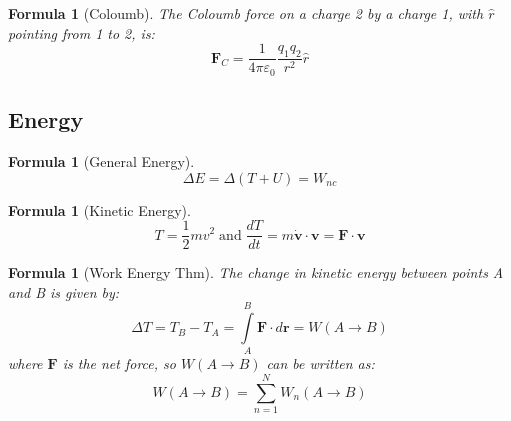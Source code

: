\documentclass[12pt]{article}
\newtheorem{for}[thm]{Formula}
\theoremstyle{definition}
\theoremstyle{remark}
\numberwithin{equation}{section}
\newcommand\B[1]{\textbf{#1}}
\begin{document}
\vspace{15pt}


\begin{for}[Coloumb]
        The Coloumb force on a charge 2 by a charge 1, with $\hat{r}$ pointing from 1 to 2, is:
        \begin{equation}
                \B{F}_C = \frac{1}{4\pi \varepsilon_0}\frac{q_1q_2}{r^2}\hat{r}
        \end{equation}
\end{for}


\vspace{15pt}


\subsection{Energy}


\begin{for}[General Energy]
        \begin{equation}
                \Delta E = \Delta(T + U) = W_{nc}
        \end{equation}
\end{for}

\vspace{15pt}

\begin{for}[Kinetic Energy]
        \begin{equation}
                T = \frac{1}{2}mv^2\;\text{and}\;\frac{dT}{dt} = m\dot{\B{v}}\cdot\B{v} = \B{F} \cdot\B{v}
        \end{equation}
\end{for}


\vspace{15pt}

\begin{for}[Work Energy Thm]
        The change in kinetic energy between points A and B is given by:
        \begin{equation}
                \Delta T = T_B - T_A = \int\limits_{A}^B\B{F}\cdot d\B{r} = W(A\rightarrow B)
        \end{equation}
        where $\B{F}$ is the net force, so $W(A\rightarrow B)$ can be written as:
        \begin{equation}
                W(A\rightarrow B) = \sum\limits_{n=1}^NW_n(A\rightarrow B)
        \end{equation}
\end{for}


\vspace{15pt}
\end{document}
